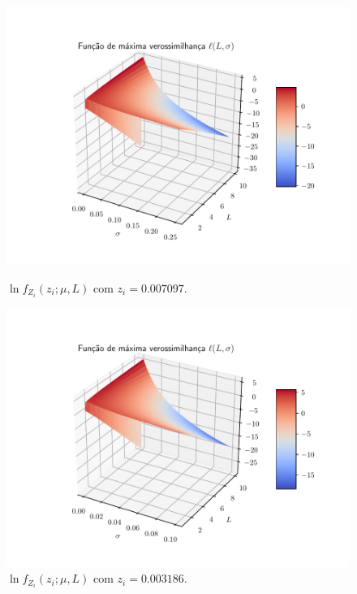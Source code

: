 \documentclass[journal,article,submit,moreauthors,pdftex]{Definitions/mdpi}
\begin{document}
\begin{figure}[hbt]
  \includegraphics[width=\linewidth]{funv_max_ver_j_10_flevoland.pdf}
  	\caption{$\ln f_{Z_{i}}(z_{i};\mu,L)$ com $z_i= 0.007097$.}\label{funv_max_ver_j_10_flevoland}
\endminipage\hfill
{}
  \includegraphics[width=\linewidth]{funv_max_ver_j_20_flevoland.pdf}
		\caption{$\ln f_{Z_{i}}(z_{i};\mu,L)$ com $z_i=0.003186$.}\label{funv_max_ver_j_20_flevoland}
\endminipage\hfill
\centering
\vspace{0.5cm}

\end{figure}
\end{document}
